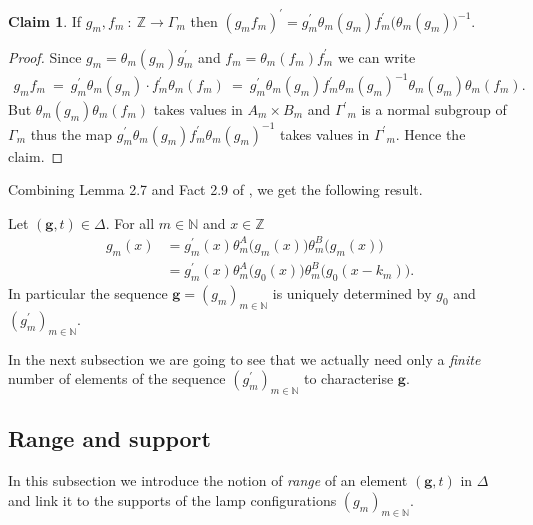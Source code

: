 \documentclass[english, 11pt, a4paper]{article}
\theoremstyle{definition}
\newtheorem{Claim}[Def]{Claim}
\numberwithin{equation}{section}
\newcommand{\bN}{\mathbb{N}}
\newcommand{\bZ}{\mathbb{Z}}
\newcommand{\mbfg}{\boldsymbol{g}}
\newcommand{\Gsp}{{\Gamma^\prime}_m}
\newcommand{\BZ}{\Delta}
\begin{document}
\begin{Claim}\label{Claim:DeriveeProduit}
  If $g_m,f_m \ : \ \bZ \rightarrow \Gamma_m$ then
   $(g_mf_m)^{\prime}=g^{\prime}_m\theta_m(g_m)f^{\prime}_m\Big(\theta_m(g_m) \Big)^{-1}$.
\end{Claim}
\begin{proof}
  Since  $g_m=\theta_m(g_m) g^{\prime}_m$ and  $f_m=\theta_m(f_m) f^{\prime}_m$
  we can write
  \begin{align*}
    g_mf_m \
    = \ g^{\prime}_m\theta_m(g_m) \cdot f^{\prime}_m\theta_m(f_m)\ 
    = \ g^{\prime}_m\theta_m(g_m)f^{\prime}_m\theta_m(g_m)^{-1}\theta_m(g_m)\theta_m(f_m).
  \end{align*}
  But $\theta_m(g_m)\theta_m(f_m)$ takes values in $A_m\times B_m$ and
  $\Gsp$ is a normal subgroup of $\Gamma_m$ thus the map
  $g^{\prime}_m\theta_m(g_m)f^{\prime}_m\theta_m(g_m)^{-1}$ takes
  values in $\Gsp$. Hence the claim.
\end{proof}
Combining Lemma 2.7 and Fact 2.9 of
\cite{BZ}, we get the following result.

\begin{Lmm}
  \label{Lmm:deffm}
  Let $(\mbfg, t) \in \BZ$. For all $m\in \bN$
  and $x\in \bZ$
  \begin{align*}
    g_m(x)&=g^\prime_m(x) \theta^A_m\big(g_m(x)\big)\theta^B_m\big(g_m(x)\big)\\
    &=g^\prime_m(x) \theta^A_m\big(g_0(x)\big)\theta^B_m\big(g_0(x-k_m)\big).
  \end{align*}
  In particular the sequence $\mbfg=\left( g_m \right)_{m\in \bN}$ is uniquely determined
  by $g_0$ and $\left( g^\prime_m \right)_{m\in \bN}$. 
\end{Lmm}
In the next subsection we are going to see that we actually need only a
\emph{finite} number of elements of the sequence $(g^{\prime}_m)_{m \in \bN}$ to
characterise $\mbfg$.

\subsection{Range and support}
In this subsection we introduce the notion of \emph{range} of an element $(\mbfg,t)$ in $\BZ$
and link it to the supports of the lamp configurations $(g_m)_{m\in \bN}$.
\end{document}
